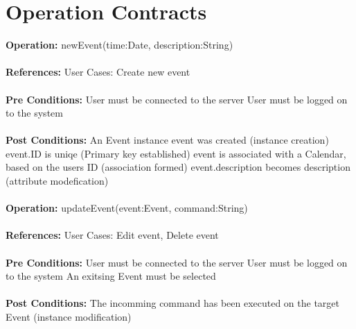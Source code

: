\documentclass[a4paper,10pt,titlepage]{article}
\begin{document}
\section{Operation Contracts}
	\textbf{Operation:}	newEvent(time:Date, description:String)
	\\ \\
	\textbf{References:}	User Cases:	Create new event
	\\ \\
	\textbf{Pre Conditions:}		
						User must be connected to the server
						User must be logged on to the system
					\\ \\
	\textbf{Post Conditions:}	
						An Event instance event was created (instance creation)
						event.ID is uniqe (Primary key established)
						event is associated with a Calendar, based on the users ID (association formed)
						event.description becomes description (attribute modefication)	
					\\ \\	
	\textbf{Operation:}	updateEvent(event:Event, command:String)
	\\ \\
	\textbf{References:}	User Cases:	Edit event, Delete event
	\\ \\
	\textbf{Pre Conditions:}
						User must be connected to the server
						User must be logged on to the system
						An exitsing Event must be selected
	\\ \\	
	\textbf{Post Conditions:}
						The incomming command has been executed on the target Event (instance modification)
						
						
\end{document}
